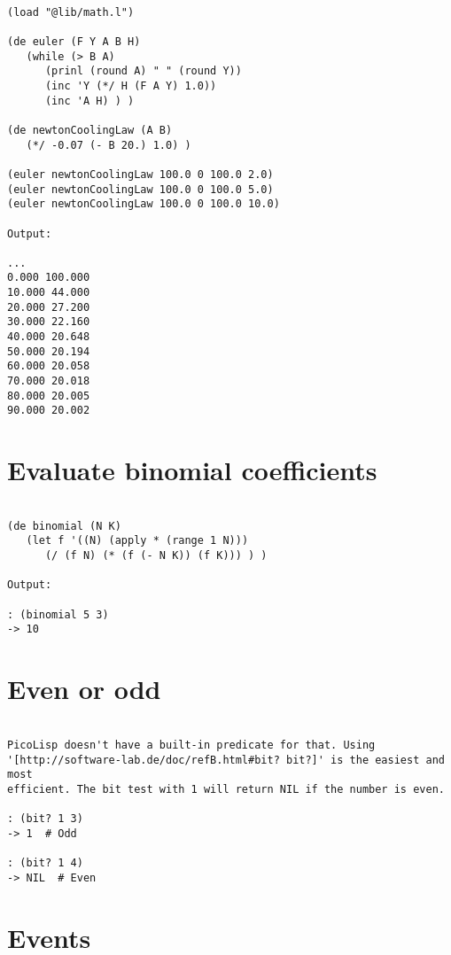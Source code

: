 \begin{verbatim}

(load "@lib/math.l")

(de euler (F Y A B H)
   (while (> B A)
      (prinl (round A) " " (round Y))
      (inc 'Y (*/ H (F A Y) 1.0))
      (inc 'A H) ) )

(de newtonCoolingLaw (A B)
   (*/ -0.07 (- B 20.) 1.0) )

(euler newtonCoolingLaw 100.0 0 100.0 2.0)
(euler newtonCoolingLaw 100.0 0 100.0 5.0)
(euler newtonCoolingLaw 100.0 0 100.0 10.0)

Output:

...
0.000 100.000
10.000 44.000
20.000 27.200
30.000 22.160
40.000 20.648
50.000 20.194
60.000 20.058
70.000 20.018
80.000 20.005
90.000 20.002

\end{verbatim}

\section*{Evaluate binomial coefficients}

\begin{verbatim}

(de binomial (N K)
   (let f '((N) (apply * (range 1 N)))
      (/ (f N) (* (f (- N K)) (f K))) ) )

Output:

: (binomial 5 3)
-> 10

\end{verbatim}

\section*{Even or odd}

\begin{verbatim}

PicoLisp doesn't have a built-in predicate for that. Using
'[http://software-lab.de/doc/refB.html#bit? bit?]' is the easiest and most
efficient. The bit test with 1 will return NIL if the number is even.

: (bit? 1 3)
-> 1  # Odd

: (bit? 1 4)
-> NIL  # Even

\end{verbatim}

\section*{Events}

